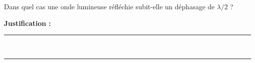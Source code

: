 Dans quel cas une onde lumineuse réfléchie subit-elle un déphasage de $\lambda/2$ ?

\choices

\noindent\textbf{Justification :} \hrulefill \\[2.5ex]
\rule{\linewidth}{0.4pt} \\[2.5ex]
\rule{\linewidth}{0.4pt}
\vfill
